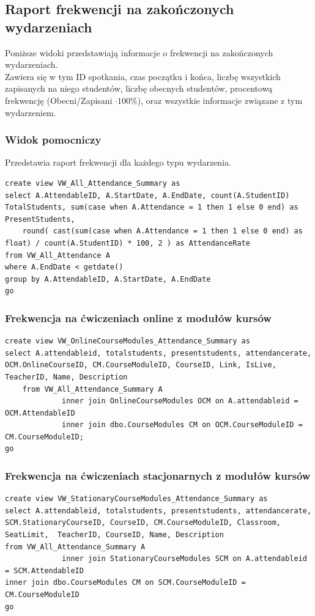 \documentclass[11pt,a4paper]{article}
\begin{document}
\subsection{Raport frekwencji na zakończonych wydarzeniach}
Poniższe widoki przedstawiają informacje o frekwencji na zakończonych wydarzeniach. \\ Zawiera się w tym ID spotkania, czas początku i końca, liczbę wszystkich zapisanych na niego studentów, liczbę obecnych studentów, procentową frekwencję (Obecni/Zapisani $\cdot 100\%$), oraz wszystkie informacje związane z tym wydarzeniem.
\subsubsection{Widok pomocniczy}
Przedstawia raport frekwencji dla każdego typu wydarzenia.
\begin{Verbatim}[breaklines=true]
create view VW_All_Attendance_Summary as
select A.AttendableID, A.StartDate, A.EndDate, count(A.StudentID) TotalStudents, sum(case when A.Attendance = 1 then 1 else 0 end) as PresentStudents,
    round( cast(sum(case when A.Attendance = 1 then 1 else 0 end) as float) / count(A.StudentID) * 100, 2 ) as AttendanceRate
from VW_All_Attendance A 
where A.EndDate < getdate()
group by A.AttendableID, A.StartDate, A.EndDate
go    
\end{Verbatim}

\subsubsection{Frekwencja na ćwiczeniach online z modułów kursów}
\begin{Verbatim}[breaklines=true]
create view VW_OnlineCourseModules_Attendance_Summary as
select A.attendableid, totalstudents, presentstudents, attendancerate, OCM.OnlineCourseID, CM.CourseModuleID, CourseID, Link, IsLive, TeacherID, Name, Description
    from VW_All_Attendance_Summary A
             inner join OnlineCourseModules OCM on A.attendableid = OCM.AttendableID
             inner join dbo.CourseModules CM on OCM.CourseModuleID = CM.CourseModuleID;
go  
\end{Verbatim}

\subsubsection{Frekwencja na ćwiczeniach stacjonarnych z modułów kursów}
\begin{Verbatim}[breaklines=true]
create view VW_StationaryCourseModules_Attendance_Summary as
select A.attendableid, totalstudents, presentstudents, attendancerate, SCM.StationaryCourseID, CourseID, CM.CourseModuleID, Classroom, SeatLimit,  TeacherID, CourseID, Name, Description
from VW_All_Attendance_Summary A
             inner join StationaryCourseModules SCM on A.attendableid = SCM.AttendableID
inner join dbo.CourseModules CM on SCM.CourseModuleID = CM.CourseModuleID
go
\end{Verbatim}
\end{document}
